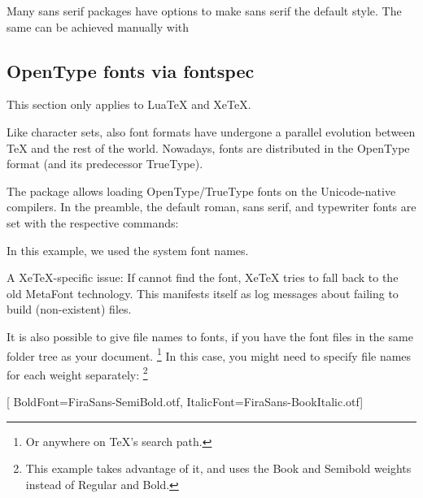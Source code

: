 Many sans serif packages have options to make sans serif the default style.
The same can be achieved manually with
\begin{ExampleCode}
\renewcommand{\familydefault}{\sfdefault}
\end{ExampleCode}


%
%
\subsection{OpenType fonts via fontspec}

\begin{remark}
This section only applies to LuaTeX and XeTeX.
\end{remark}

Like character sets, also font formats have undergone a parallel evolution
between \TeX{} and the rest of the world.
Nowadays, fonts are distributed in the OpenType format (and its predecessor TrueType).

The  package allows loading OpenType/TrueType fonts
on the Unicode-native compilers.
In the preamble, the default roman, sans serif, and typewriter fonts are
set with the respective commands:%
%
\begin{ExampleCode}
\setmainfont{Times New Roman}
\setsansfont{Comic Sans MS}
\setmonofont{Consolas}
\end{ExampleCode}
%
In this example, we used the system font names.

\begin{technote}
A XeTeX-specific issue:
If  cannot find the font,
XeTeX tries to fall back to the old MetaFont technology.
This manifests itself as log messages about  failing to build (non-existent) files.
\end{technote}

It is also possible to give file names to fonts,
if you have the font files in the same folder tree as your document.%
\footnote{Or anywhere on \TeX's search path.}
In this case, you might need to specify file names for each weight separately:%
\footnote{This example takes advantage of it,
and uses the Book and Semibold weights instead of Regular and Bold.}
%
\begin{ExampleCode}
\setmainfont{FiraSans-Book.otf}[
    BoldFont={FiraSans-SemiBold.otf},
    ItalicFont={FiraSans-BookItalic.otf}]
\end{ExampleCode}

